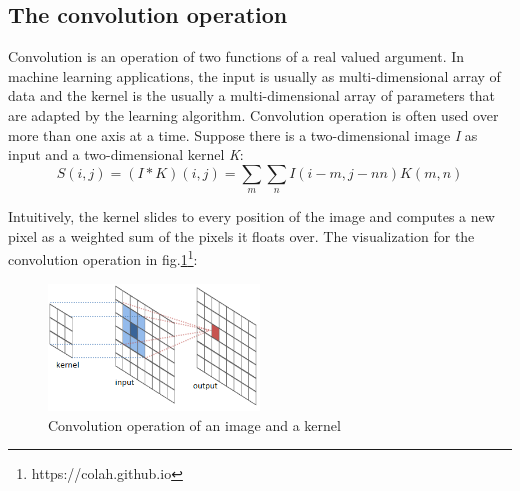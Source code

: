 \subsection{The convolution operation}
\hspace{0.5cm} Convolution is an operation of two functions of a real valued argument. In machine learning applications, the input is usually as multi-dimensional array of data and the kernel is the usually a multi-dimensional array of parameters that are adapted by the learning algorithm. Convolution operation is often used over more than one axis at a time. Suppose there is a two-dimensional image \textit{I} as input and a two-dimensional kernel \textit{K}:
\begin{equation}
    S(i,j) = (I*K)(i,j) = \underset{m}{\sum}\underset{n}{\sum}I(i-m,j-nn)K(m,n)
\end{equation}
\par
Intuitively, the kernel slides to every position of the image and computes a new pixel as a weighted sum of the pixels it floats over. The visualization for the convolution operation in fig.\ref{fig:conv}\footnote{https://colah.github.io}:\par
\begin{figure}[h!]
    \centering
    \includegraphics[width=0.5\textwidth]{Chapters/Fig/conv.png}
    \caption{Convolution operation of an image and a kernel}
    \label{fig:conv}
\end{figure}\par
